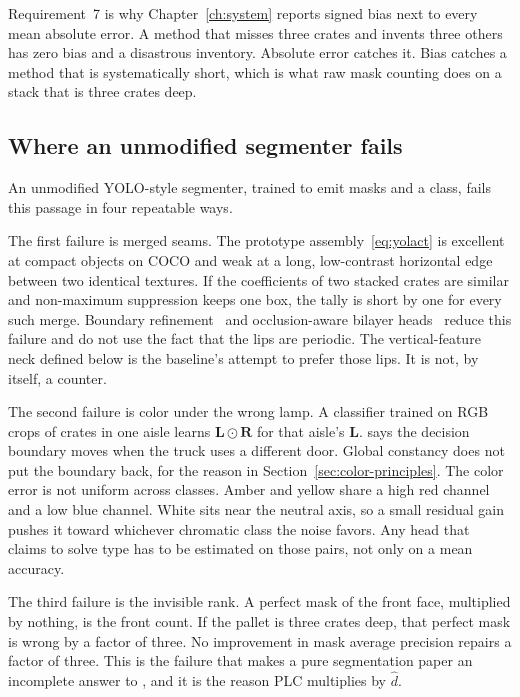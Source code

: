 Requirement~7 is why Chapter~\ref{ch:system} reports signed bias next to every mean absolute error. A method that misses three crates and invents three others has zero bias and a disastrous inventory. Absolute error catches it. Bias catches a method that is systematically short, which is what raw mask counting does on a stack that is three crates deep.

\subsection{Where an unmodified segmenter fails}
\label{sec:fail}

An unmodified YOLO-style segmenter, trained to emit masks and a class, fails this passage in four repeatable ways.

The first failure is merged seams. The prototype assembly~\eqref{eq:yolact} is excellent at compact objects on COCO and weak at a long, low-contrast horizontal edge between two identical textures. If the coefficients of two stacked crates are similar and non-maximum suppression keeps one box, the tally is short by one for every such merge. Boundary refinement~\cite{kirillov2020pointrend,tang2021bpr} and occlusion-aware bilayer heads~\cite{ke2021bcnet} reduce this failure and do not use the fact that the lips are periodic. The vertical-feature neck defined below is the baseline's attempt to prefer those lips. It is not, by itself, a counter.

The second failure is color under the wrong lamp. A classifier trained on RGB crops of crates in one aisle learns $\mathbf{L}\odot\mathbf{R}$ for that aisle's $\mathbf{L}$.  says the decision boundary moves when the truck uses a different door. Global constancy does not put the boundary back, for the reason in Section~\ref{sec:color-principles}. The color error is not uniform across classes. Amber and yellow share a high red channel and a low blue channel. White sits near the neutral axis, so a small residual gain pushes it toward whichever chromatic class the noise favors. Any head that claims to solve type has to be estimated on those pairs, not only on a mean accuracy.

The third failure is the invisible rank. A perfect mask of the front face, multiplied by nothing, is the front count. If the pallet is three crates deep, that perfect mask is wrong by a factor of three. No improvement in mask average precision repairs a factor of three. This is the failure that makes a pure segmentation paper an incomplete answer to , and it is the reason PLC multiplies by $\hat{d}$.

